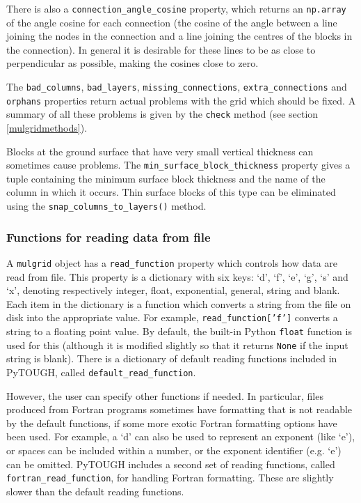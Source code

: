 There is also a \texttt{connection\_angle\_cosine} property, which returns an \texttt{np.array} of the angle cosine for each connection (the cosine of the angle between a line joining the nodes in the connection and a line joining the centres of the blocks in the connection).  In general it is desirable for these lines to be as close to perpendicular as possible, making the cosines close to zero.

The \texttt{bad\_columns}, \texttt{bad\_layers}, \texttt{missing\_connections}, \texttt{extra\_connections} and \texttt{orphans} properties return actual problems with the grid which should be fixed.  A summary of all these problems is given by the \texttt{check} method (see section \ref{mulgridmethods}).

Blocks at the ground surface that have very small vertical thickness can sometimes cause problems.  The \texttt{min\_surface\_block\_thickness} property gives a tuple containing the minimum surface block thickness and the name of the column in which it occurs.  Thin surface blocks of this type can be eliminated using the \texttt{snap\_columns\_to\_layers()} method.

\subsubsection{Functions for reading data from file}

A \texttt{mulgrid} object has a \texttt{read\_function} property which controls how data are read from file.  This property is a dictionary with six keys: `d', `f', `e', `g', `s' and `x', denoting respectively integer, float, exponential, general, string and blank.  Each item in the dictionary is a function which converts a string from the file on disk into the appropriate value.  For example, \texttt{read\_function['f']} converts a string to a floating point value.  By default, the built-in Python \texttt{float} function is used for this (although it is modified slightly so that it returns \texttt{None} if the input string is blank).  There is a dictionary of default reading functions included in PyTOUGH, called \texttt{default\_read\_function}.

However, the user can specify other functions if needed.  In particular, files produced from Fortran programs sometimes have formatting that is not readable by the default functions, if some more exotic Fortran formatting options have been used.   For example, a `d' can also be used to represent an exponent (like `e'), or spaces can be included within a number, or the exponent identifier (e.g. `e') can be omitted.  PyTOUGH includes a second set of reading functions, called \texttt{fortran\_read\_function}, for handling Fortran formatting.  These are slightly slower than the default reading functions.

